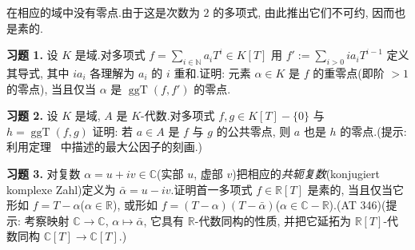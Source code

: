 在相应的域中没有零点.由于这是次数为 $2$ 的多项式, 由此推出它们不可约, 因而也是素的.

\aufgaben

\noindent\textbf{习题 1.} 设 $K$ 是域.对多项式 $f = \sum_{i \in \mathbb{N}} a_i T^i \in K[T]$ 用 $f' := \sum_{i > 0} i a_i T^{i - 1}$ 定义其导式, 其中 $i a_i$ 各理解为 $a_i$ 的 $i$ 重和.证明: 元素 $\alpha \in K$ 是 $f$ 的重零点(即阶 $> 1$ 的零点), 当且仅当 $\alpha$ 是 $\operatorname{ggT}(f, f')$ 的零点.

\medskip
\noindent\textbf{习题 2.} 设 $K$ 是域, $A$ 是 $K$-代数.对多项式 $f, g \in K[T] - \{0\}$ 与 $h = \operatorname{ggT}(f, g)$ 证明: 若 $a \in A$ 是 $f$ 与 $g$ 的公共零点, 则 $a$ 也是 $h$ 的零点.(提示: 利用定理~ 中描述的最大公因子的刻画.)

\medskip
\noindent\textbf{习题 3.} 对复数 $\alpha = u + iv \in \mathbb{C}$(实部 $u$, 虚部 $v$)把相应的\emph{共轭复数}(\textup{konjugiert komplexe Zahl})定义为 $\bar{\alpha} = u - iv$.证明首一多项式 $f \in \mathbb{R}[T]$ 是素的, 当且仅当它形如 $f = T - \alpha$($\alpha \in \mathbb{R}$), 或形如 $f = (T - \alpha)(T - \bar{\alpha})$($\alpha \in \mathbb{C} - \mathbb{R}$).(AT 346)(提示: 考察映射 $\mathbb{C} \longrightarrow \mathbb{C}$, $\alpha \longmapsto \bar{\alpha}$, 它具有 $\mathbb{R}$-代数同构的性质, 并把它延拓为 $\mathbb{R}[T]$-代数同构 $\mathbb{C}[T] \longrightarrow \mathbb{C}[T]$.)
